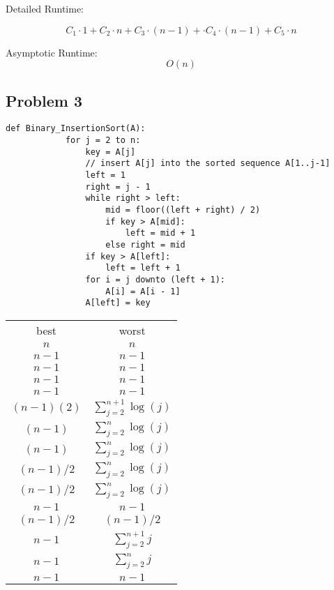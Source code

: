 \documentclass{article}
\begin{document}
Detailed Runtime:

\begin{equation*}
    C_1 \cdot 1 + C_2 \cdot n + C_3 \cdot (n - 1) + \cdot C_4 \cdot (n - 1) + C_5 \cdot n
\end{equation*}

Asymptotic Runtime:
\begin{equation*}
    O(n)
\end{equation*}

\pagebreak

\subsection*{Problem 3}
\begin{multicols}{2}
    \begin{lstlisting}[firstnumber=0]
        def Binary_InsertionSort(A):
            for j = 2 to n:
                key = A[j]
                // insert A[j] into the sorted sequence A[1..j-1]
                left = 1
                right = j - 1
                while right > left:
                    mid = floor((left + right) / 2)
                    if key > A[mid]:
                        left = mid + 1
                    else right = mid
                if key > A[left]:
                    left = left + 1
                for i = j downto (left + 1):
                    A[i] = A[i - 1]
                A[left] = key
    \end{lstlisting}
    \columnbreak
    \footnotesize
    \begin{tabular}{cc}
        best       & worst                      \\
        $n$        & $n$                        \\
        $n-1$      & $n-1$                      \\
        $n-1$      & $n-1$                      \\[1em]
        $n-1$      & $n-1$                      \\
        $n-1$      & $n-1$                      \\
        $(n-1)(2)$ & $\sum_{j=2}^{n+1} \log(j)$ \\
        $(n-1)$    & $\sum_{j=2}^{n} \log(j)$   \\[1em]
        $(n-1)$    & $\sum_{j=2}^{n} \log(j)$   \\
        $(n-1)/2$  & $\sum_{j=2}^{n} \log(j)$   \\
        $(n-1)/2$  & $\sum_{j=2}^{n} \log(j)$   \\
        $n-1$      & $n-1$                      \\
        $(n-1)/2$  & $(n-1)/2$                  \\
        $n-1$      & $\sum_{j=2}^{n+1}j$        \\
        $n-1$      & $\sum_{j=2}^{n}j$          \\
        $n-1$      & $n-1$                      \\
    \end{tabular}
\end{multicols}
\end{document}

